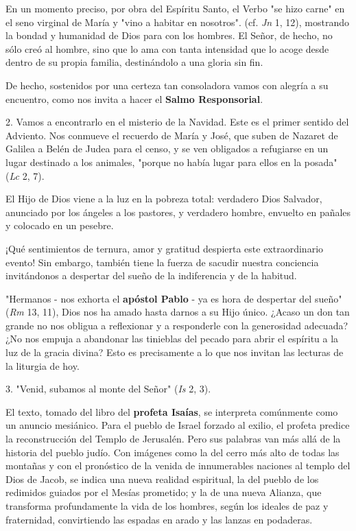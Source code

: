 \begin{body}
\begin{body}
En un momento preciso, por obra del Espíritu Santo, el Verbo "se hizo carne" en el seno virginal de María y "vino a habitar en nosotros". (cf. \emph{Jn} 1, 12), mostrando la bondad y humanidad de Dios para con los hombres. El Señor, de hecho, no sólo creó al hombre, sino que lo ama con tanta intensidad que lo acoge desde dentro de su propia familia, destinándolo a una gloria sin fin.

De hecho, sostenidos por una certeza tan consoladora vamos con alegría a su encuentro, como nos invita a hacer el \textbf{Salmo Responsorial}.

2. Vamos a encontrarlo en el misterio de la Navidad. Este es el primer sentido del Adviento. Nos conmueve el recuerdo de María y José, que suben de Nazaret de Galilea a Belén de Judea para el censo, y se ven obligados a refugiarse en un lugar destinado a los animales, "porque no había lugar para ellos en la posada" (\emph{Lc} 2, 7).

El Hijo de Dios viene a la luz en la pobreza total: verdadero Dios Salvador, anunciado por los ángeles a los pastores, y verdadero hombre, envuelto en pañales y colocado en un pesebre.

¡Qué sentimientos de ternura, amor y gratitud despierta este extraordinario evento! Sin embargo, también tiene la fuerza de sacudir nuestra conciencia invitándonos a despertar del sueño de la indiferencia y de la habitud.

"Hermanos - nos exhorta el \textbf{apóstol Pablo} - ya es hora de despertar del sueño" (\emph{Rm} 13, 11), Dios nos ha amado hasta darnos a su Hijo único. ¿Acaso un don tan grande no nos obligua a reflexionar y a responderle con la generosidad adecuada? ¿No nos empuja a abandonar las tinieblas del pecado para abrir el espíritu a la luz de la gracia divina? Esto es precisamente a lo que nos invitan las lecturas de la liturgia de hoy.

3. "Venid, subamos al monte del Señor" (\emph{Is} 2, 3).

El texto, tomado del libro del \textbf{profeta Isaías}, se interpreta comúnmente como un anuncio mesiánico. Para el pueblo de Israel forzado al exilio, el profeta predice la reconstrucción del Templo de Jerusalén. Pero sus palabras van más allá de la historia del pueblo judío. Con imágenes como la del cerro más alto de todas las montañas y con el pronóstico de la venida de innumerables naciones al templo del Dios de Jacob, se indica una nueva realidad espiritual, la del pueblo de los redimidos guiados por el Mesías prometido; y la de una nueva Alianza, que transforma profundamente la vida de los hombres, según los ideales de paz y fraternidad, convirtiendo las espadas en arado y las lanzas en podaderas.


\end{body}
\end{body}
